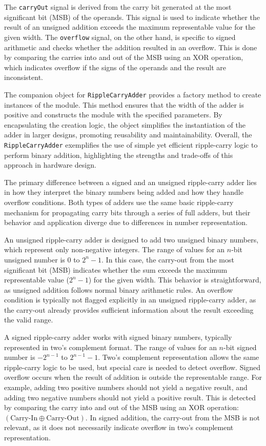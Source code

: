 {The \texttt{carryOut} signal is derived from the carry bit generated at the most significant bit (MSB) of the operands. This signal is used to indicate whether the result of an unsigned addition exceeds the maximum representable value for the given width. The \texttt{overflow} signal, on the other hand, is specific to signed arithmetic and checks whether the addition resulted in an overflow. This is done by comparing the carries into and out of the MSB using an XOR operation, which indicates overflow if the signs of the operands and the result are inconsistent.

The companion object for \texttt{RippleCarryAdder} provides a factory method to create instances of the module. This method ensures that the width of the adder is positive and constructs the module with the specified parameters. By encapsulating the creation logic, the object simplifies the instantiation of the adder in larger designs, promoting reusability and maintainability. Overall, the \texttt{RippleCarryAdder} exemplifies the use of simple yet efficient ripple-carry logic to perform binary addition, highlighting the strengths and trade-offs of this approach in hardware design.


The primary difference between a signed and an unsigned ripple-carry adder lies in how they interpret the binary numbers being added and how they handle overflow conditions. Both types of adders use the same basic ripple-carry mechanism for propagating carry bits through a series of full adders, but their behavior and application diverge due to differences in number representation.

An unsigned ripple-carry adder is designed to add two unsigned binary numbers, which represent only non-negative integers. The range of values for an \( n \)-bit unsigned number is \( 0 \) to \( 2^n - 1 \). In this case, the carry-out from the most significant bit (MSB) indicates whether the sum exceeds the maximum representable value (\( 2^n - 1 \)) for the given width. This behavior is straightforward, as unsigned addition follows normal binary arithmetic rules. An overflow condition is typically not flagged explicitly in an unsigned ripple-carry adder, as the carry-out already provides sufficient information about the result exceeding the valid range.

A signed ripple-carry adder works with signed binary numbers, typically represented in two's complement format. The range of values for an \( n \)-bit signed number is \( -2^{n-1} \) to \( 2^{n-1} - 1 \). Two's complement representation allows the same ripple-carry logic to be used, but special care is needed to detect overflow. Signed overflow occurs when the result of addition is outside the representable range. For example, adding two positive numbers should not yield a negative result, and adding two negative numbers should not yield a positive result. This is detected by comparing the carry into and out of the MSB using an XOR operation: \((\text{Carry-In} \oplus \text{Carry-Out})\). In signed addition, the carry-out from the MSB is not relevant, as it does not necessarily indicate overflow in two's complement representation.

}

